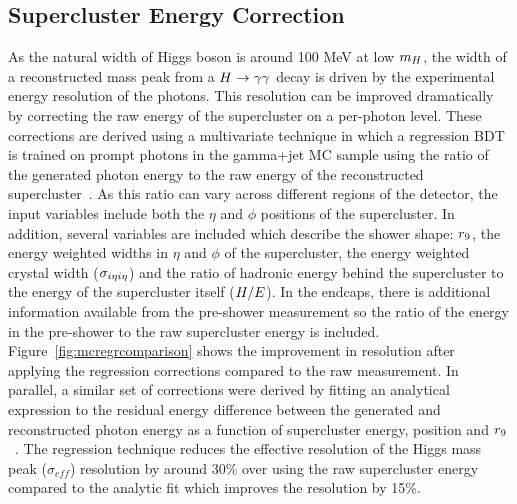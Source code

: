 \subsection{Supercluster Energy Correction}
\label{sec:superclusterenergyreconstruction}

As the natural width of Higgs boson is around 100 MeV at low $m_{H}$, 
the width of a reconstructed mass peak from 
a $H\rightarrow\gamma\gamma$ decay is driven by the experimental energy resolution of the photons.
This resolution can be improved dramatically by correcting the raw energy of the supercluster 
on a per-photon level. These corrections are derived using a multivariate technique 
in which a regression BDT is trained on prompt photons in the gamma+jet MC sample using the 
ratio of the generated photon energy to the raw energy of the reconstructed supercluster~\citep{AN-12-160}.
As this ratio can vary across different regions of the detector, 
the input variables include both the $\eta$ and $\phi$ positions of the supercluster.
In addition, several variables are included which describe the shower shape: $r_{9}$, 
the energy weighted widths in $\eta$ and $\phi$ of the supercluster, the energy 
weighted crystal width ($\sigma_{i\eta i\eta}$) and the ratio of hadronic energy behind the supercluster
to the energy of the supercluster itself ($H/E$). 
In the endcaps, there is additional information 
available from the pre-shower measurement so the ratio of the energy in 
the pre-shower to the raw supercluster energy is included. 
Figure~\ref{fig:mcregrcomparison} shows the improvement
in resolution after applying the regression corrections compared to the raw measurement.
In parallel, a similar set of corrections were derived by fitting an analytical expression 
to the residual energy difference between the 
generated and reconstructed photon energy as a function of 
supercluster energy, position and $r_{9}$~\citep{AN-11-343}. 
The regression technique reduces the effective resolution of the Higgs mass peak ($\sigma_{eff}$) 
resolution by around 30\% over using the raw supercluster energy 
compared to the analytic fit which improves the resolution by 15\%. 

